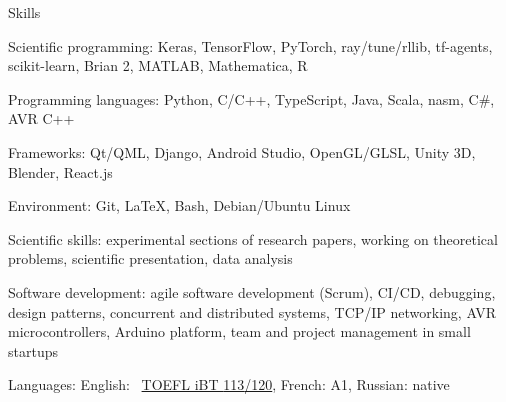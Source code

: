 \documentclass{resume} %
\newcommand*{\mybold}[1]{{\color{gray} #1}}
\newcommand*{\myboldq}[1]{{#1}}
\newcommand{\mylink}{{\color{gray}\faExternalLink}}
\begin{document}
\vspace{-2em}
\begin{rSection}{Skills}
	\vspace{-1em}
	\item \myboldq{Scientific programming:} \mybold{Keras, TensorFlow, PyTorch,} ray/tune/rllib, tf-agents, scikit-learn, Brian 2, MATLAB, Mathematica, R
	\item \myboldq{Programming languages:} \mybold{Python, C/C++}, TypeScript, Java, {\small Scala, nasm, C\#, AVR C++}
	\item \myboldq{Frameworks:} Qt/QML, Django, {\small Android Studio, OpenGL/GLSL, Unity 3D, Blender, React.js}
	\item \myboldq{Environment:} \mybold{Git, \LaTeX, Bash, Debian/Ubuntu Linux}
	\item \myboldq{Scientific skills:} \mybold{experimental} sections of research papers, working on \mybold{theoretical} problems, scientific presentation, data analysis
	\item \myboldq{Software development:} \mybold{agile} software development (Scrum), CI/CD, debugging, design patterns, concurrent and distributed systems, {\small TCP/IP networking, AVR microcontrollers, Arduino platform, team and project management in \mybold{small startups}}
	\item \myboldq{Languages:} English: \mylink~\href{https://sergeivolodin.github.io/epfl/TOEFL.pdf}{TOEFL iBT \mybold{113}/120}, {\small French: A1, Russian: native}
\end{rSection}
\end{document}
